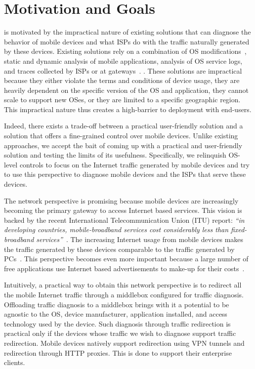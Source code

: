 \section{Motivation and Goals}

\meddle is motivated by the impractical nature of existing solutions that can diagnose the behavior of mobile devices and what ISPs do with the traffic naturally generated by these devices. 
Existing solutions rely on a combination of OS modifications~\cite{enck:taintdroid, hornyack:appfence, pathak:eprof, qian:mobilearo,wei:profiledroid}, static and dynamic analysis of mobile applications\cite{egele:pios, ravindranath:appinsight}, analysis of OS service logs\cite{falaki:smartphoneusage}, and traces collected by ISPs or at gateways~\cite{vallina-rodriguez:bfc}. .
These solutions are impractical because they either violate the terms and conditions of device usage, they are heavily dependent on the specific version of the OS and application, they cannot scale to support new OSes, or they are limited to a specific geographic region.
This impractical nature thus creates a high-barrier to deployment with end-users.

Indeed, there exists a trade-off between a practical user-friendly solution and a solution that offers a fine-grained control over mobile devices. 
Unlike existing approaches, we accept the bait of coming up with a practical and user-friendly solution and testing the limits of its usefulness. 
Specifically, we relinquish OS-level controls to focus on the Internet traffic generated by mobile devices and try to use this perspective to diagnose mobile devices and the ISPs that serve these devices. 

The network perspective is promising because mobile devices are increasingly becoming the primary gateway to access Internet based services. 
This vision is backed by the recent International Telecommunication Union (ITU) report: \emph{``in developing countries, mobile-broadband services cost considerably less than fixed-broadband services''}~\cite{ict:facts}.
The increasing Internet usage from mobile devices makes the traffic generated by these devices comparable to the traffic generated by PCs~\cite{falaki:smartphoneusage}.
This perspective becomes even more important because a large number of free applications use Internet based advertisements to make-up for their costs~\cite{pathak:eprof,vallina-rodriguez:bfc}.

Intuitively, a practical way to obtain this network perspective is to redirect all the mobile Internet traffic through a middlebox configured for traffic diagnosis. 
Offloading traffic diagnosis to a middlebox brings with it a potential to be agnostic to the OS, device manufacturer, application installed, and access technology used by the device. 
Such diagnosis through traffic redirection is practical only if the devices whose traffic we wish to diagnose support traffic redirection. 
Mobile devices natively support redirection using VPN tunnels and redirection through HTTP proxies.
This is done to support their enterprise clients. 


